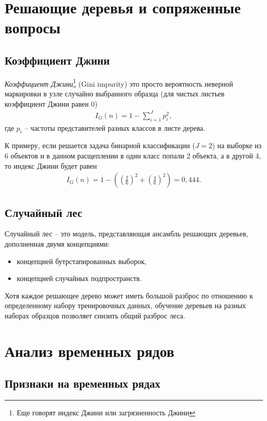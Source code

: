\documentclass[%
	11pt,
	a4paper,
	utf8,
		]{article}
\begin{document}
\section{Решающие деревья и сопряженные вопросы}

\subsection{Коэффициент Джини}

\emph{Коэффициент Джини}\footnote{Еще говорят индекс Джини или загрязненность Джини} (Gini impurity) это просто вероятность неверной маркировки в узле случайно выбранного образца (для чистых листьев коэффициент Джини равен 0)
\begin{align}
	I_G(n) = 1 - \sum_{i=1}^{J}p_i^2,
\end{align}
где $ p_i $ -- частоты представителей разных классов в листе дерева.

К примеру, если решается задача бинарной классификации ($ J = 2 $) на выборке из 6 объектов и в данном расщеплении в один класс попали 2 объекта, а в другой 4, то индекс Джини будет равен
\begin{align}
	I_G(n)=1 - \left( \left( \frac{2}{6} \right)^2 + \left( \frac{4}{6} \right)^2 \right) = 0,444.
\end{align}

\subsection{Случайный лес}

Случайный лес -- это модель, представляющая ансамбль решающих деревьев, дополненная двумя концепциями:
\begin{itemize}
	\item концепцией бутрстапированных выборок,
	
	\item концепцией случайных подпространств.
\end{itemize}

Хотя каждое решающее дерево может иметь большой разброс по отношению к определенному набору тренировочных данных, обучение деревьев на разных наборах образцов позволяет снизить общий разброс леса.


\section{Анализ временных рядов}

\subsection{Признаки на временных рядах}
\end{document}
